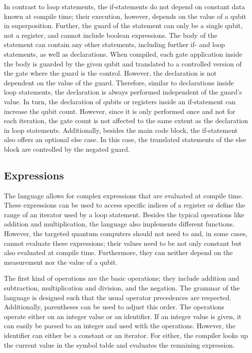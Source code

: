 In contrast to loop statements, the if-statements do not depend on constant data known at compile time; their execution, however, depends on the value of a qubit in superposition. Further, the guard of the statement can only be a single qubit, not a register, and cannot include boolean expressions.
The body of the statement can contain any other statements, including further if- and loop statements, as well as declarations. When compiled, each gate application inside the body is guarded by the given qubit and translated to a controlled version of the gate where the guard is the control. However, the declaration is not dependent on the value of the guard. Therefore, similar to declarations inside loop statements, the declaration is always performed independent of the guard's value. In turn, the declaration of qubits or registers inside an if-statement can increase the qubit count. However, since it is only performed once and not for each iteration, the gate count is not affected to the same extent as the declaration in loop statements. Additionally, besides the main code block, the if-statement also offers an optional else case. In this case, the translated statements of the else block are controlled by the negated guard. 

\subsection{Expressions}
\label{sec:concept_expressions}
The language allows for complex expressions that are evaluated at compile time. These expressions can be used to access specific indices of a register or define the range of an iterator used by a loop statement. Besides the typical operations like addition and multiplication, the language also implements different functions. However, the targeted quantum computers should not need to and, in some cases, cannot evaluate these expressions; their values need to be not only constant but also evaluated at compile time. Furthermore, they can neither depend on the measurement nor the value of a qubit.

The first kind of operations are the basic operations; they include addition and subtraction, multiplication and division, and the negation. The grammar of the language is designed such that the usual operator precedences are respected. Additionally, parentheses can be used to adjust this order. The operations operate either on an integer value or an identifier. If an integer value is given, it can easily be parsed to an integer and used with the operations. However, the identifier can either be a constant or an iterator. For either, the compiler looks up the current value in the symbol table and evaluates the remaining expression. 

